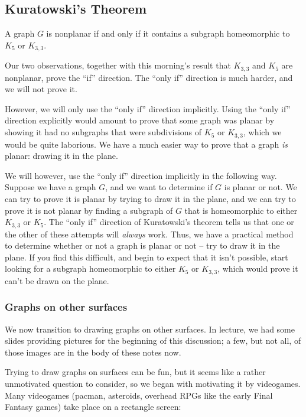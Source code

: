 \documentclass[]{article}
\begin{document}
\subsection{Kuratowski's Theorem}\label{kuratowskis-theorem}

A graph \(G\) is nonplanar if and only if it contains a subgraph
homeomorphic to \(K_5\) or \(K_{3,3}\).

Our two observations, together with this morning's result that
\(K_{3,3}\) and \(K_5\) are nonplanar, prove the ``if'' direction. The
``only if'' direction is much harder, and we will not prove it.

However, we will only use the ``only if'' direction implicitly. Using
the ``only if'' direction explicitly would amount to prove that some
graph was planar by showing it had no subgraphs that were subdivisions
of \(K_5\) or \(K_{3,3}\), which we would be quite laborious. We have a
much easier way to prove that a graph \emph{is} planar: drawing it in
the plane.

We will however, use the ``only if'' direction implicitly in the
following way. Suppose we have a graph \(G\), and we want to determine
if \(G\) is planar or not. We can try to prove it is planar by trying to
draw it in the plane, and we can try to prove it is not planar by
finding a subgraph of \(G\) that is homeomorphic to either \(K_{3,3}\)
or \(K_5\). The ``only if'' direction of Kuratowski's theorem tells us
that one or the other of these attempts will \emph{always} work. Thus,
we have a practical method to determine whether or not a graph is planar
or not -- try to draw it in the plane. If you find this difficult, and
begin to expect that it isn't possible, start looking for a subgraph
homeomorphic to either \(K_5\) or \(K_{3,3}\), which would prove it
can't be drawn on the plane.

\subsubsection{Graphs on other surfaces}\label{graphs-on-other-surfaces}

We now transition to drawing graphs on other surfaces. In lecture, we
had some slides providing pictures for the beginning of this discussion;
a few, but not all, of those images are in the body of these notes now.

Trying to draw graphs on surfaces can be fun, but it seems like a rather
unmotivated question to consider, so we began with motivating it by
videogames. Many videogames (pacman, asteroids, overhead RPGs like the
early Final Fantasy games) take place on a rectangle screen:
\end{document}
